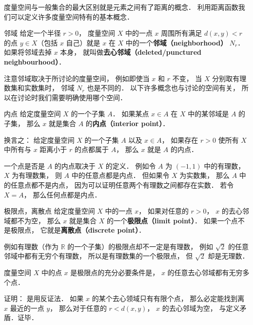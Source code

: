 
度量空间与一般集合的最大区别就是元素之间有了距离的概念． 利用距离函数我们可以定义许多度量空间特有的基本概念．

\begin{definition}{邻域}
给定一个半径 $r > 0$， 度量空间 $X$ 中的一点 $x$ 周围所有满足 $d(x, y) < r$ 的点 $y \in X$（包括 $x$ 自己）就是 $x$ 在 $X$ 中的一个\textbf{邻域（neighborhood）} $N_r$． 如果将邻域去掉 $x$ 本身， 就叫做\textbf{去心邻域（deleted/punctured neighbourhood）}．
\end{definition}
注意邻域取决于所讨论的度量空间， 例如即使当 $x$ 和 $r$ 不变， 当 $X$ 分别取有理数集和实数集时， 邻域 $N_r$ 也是不同的． 以下许多概念也与讨论的空间有关， 所以在讨论时我们需要明确使用哪个空间．

\begin{definition}{内点}\label{Metri2_def2}
给定度量空间 $X$ 的一个子集 $A$． 如果某点 $x\in A$ 在 $X$ 中的某邻域是 $A$ 的子集， 那么 $x$ 就是集合 $A$ 的\textbf{内点（interior point）}．

换言之： 给定度量空间 $X$ 的一个子集 $A$ 以及 $x \in A$， 如果存在 $r > 0$ 使所有 $X$ 中所有与 $x$ 距离小于 $r$ 的点都属于 $A$， 那么 $x$ 就是 $A$ 的内点．
\end{definition}

\begin{example}{}\label{Metri2_ex1}
一个点是否是 $A$ 的内点取决于 $X$ 的定义． 例如令 $A$ 为 $(-1, 1)$ 中的有理数， $X$ 为有理数集， 则 $A$ 中的任意点都是内点． 但如果令 $X$ 为实数集， 那么 $A$ 中的任意点都不是内点， 因为可以证明任意两个有理数之间都存在实数．%
若令 $X = A$， 那么任何点都是内点．
\end{example}

\begin{definition}{极限点，离散点}
给定度量空间 $X$ 中的一点 $x$， 如果对任意的 $r > 0$， $x$ 的去心邻域都不为空， 那么 $x$ 就是集合 $X$ 的一个\textbf{极限点（limit point）}． 如果一个点不是极限点， 它就是\textbf{离散点（discrete point）}．
\end{definition}
例如有理数（作为 $\mathbb R$ 的一个子集）的极限点却不一定是有理数， 例如 $\sqrt{2}$ 的任意邻域中都有无穷个有理数， 所以是有理数集的一个极限点， 但 $\sqrt{2}$ 却是无理数．

\begin{corollary}{}
度量空间 $X$ 中的点 $x$ 是极限点的充分必要条件是， $x$ 的任意去心邻域都有无穷多个点．
\end{corollary}
证明： 是用反证法． 如果 $x$ 的某个去心领域只有有限个点， 那么必定能找到离 $x$ 最近的一点 $y$， 那么对于任意的 $r < d(x, y)$， $x$ 的去心邻域为空， 与定义矛盾．证毕．

